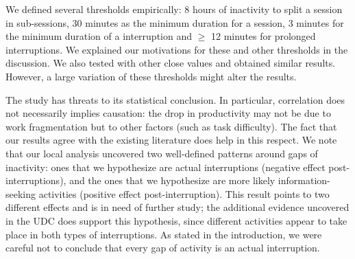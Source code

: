 \documentclass[times]{smrauth}
\begin{document}
We defined several thresholds empirically: 8 hours of inactivity to split a session in sub-sessions, 30 minutes as the minimum duration for a session, 3 minutes for the minimum duration of a interruption and  $\geq$ 12 minutes for prolonged interruptions. We explained our motivations for these and other thresholds in the discussion. We also tested with other close values and obtained similar results. However, a large variation of these thresholds might alter the results. 




The study has threats to its statistical conclusion. In particular, correlation does not necessarily implies causation: the drop in productivity may not be due to work fragmentation but to other factors (such as task difficulty). The fact that our results agree with the existing literature does help in this respect. We note that our local analysis uncovered two well-defined patterns around gaps of inactivity: ones that we hypothesize are actual interruptions (negative effect post-interruptions), and the ones that we hypothesize are more likely information-seeking activities (positive effect post-interruption). This result points to two different effects and is in need of further study; the additional evidence uncovered in the UDC does support this hypothesis, since different activities appear to take place in both types of interruptions. As stated in the introduction, we were careful not to conclude that every gap of activity is an actual interruption.
\end{document}
